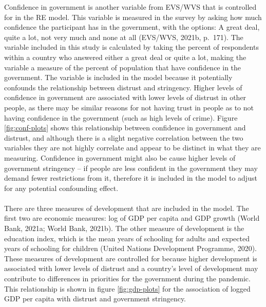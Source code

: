 \documentclass[
  12pt,
]{article}
\begin{document}
Confidence in government is another variable from EVS/WVS that is controlled for in the RE model. This variable is measured in the survey by asking how much confidence the participant has in the government, with the options: A great deal, quite a lot, not very much and none at all (EVS/WVS, 2021b, p.~171). The variable included in this study is calculated by taking the percent of respondents within a country who answered either a great deal or quite a lot, making the variable a measure of the percent of population that have confidence in the government. The variable is included in the model because it potentially confounds the relationship between distrust and stringency. Higher levels of confidence in government are associated with lower levels of distrust in other people, as there may be similar reasons for not having trust in people as to not having confidence in the government (such as high levels of crime). Figure \ref{fig:conf-plots} shows this relationship between confidence in government and distrust, and although there is a slight negative correlation between the two variables they are not highly correlate and appear to be distinct in what they are measuring. Confidence in government might also be cause higher levels of government stringency -- if people are less confident in the government they may demand fewer restrictions from it, therefore it is included in the model to adjust for any potential confounding effect.\\
~\\
There are three measures of development that are included in the model. The first two are economic measures: log of GDP per capita and GDP growth (World Bank, 2021a; World Bank, 2021b). The other measure of development is the education index, which is the mean years of schooling for adults and expected years of schooling for children (United Nations Development Programme, 2020). These measures of development are controlled for because higher development is associated with lower levels of distrust and a country's level of development may contribute to differences in priorities for the government during the pandemic. This relationship is shown in figure \ref{fig:gdp-plots} for the association of logged GDP per capita with distrust and government stringency.\\
~\\
\end{document}
